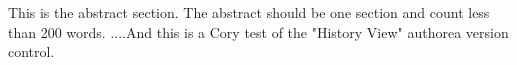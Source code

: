 This is the abstract section. The abstract should be one section and count less than 200 words. ....And this is a Cory test of the "History View" authorea version control.
